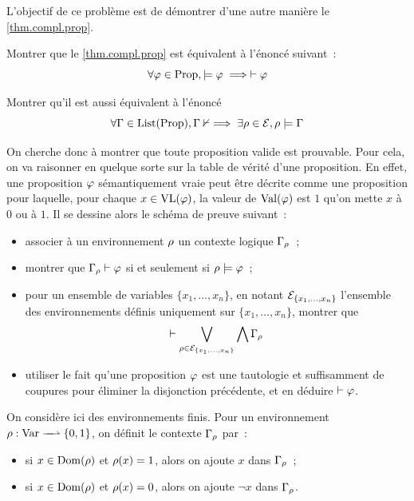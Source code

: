\begin{problem}
  L'objectif de ce problème est de démontrer d'une autre manière le
  \cref{thm.compl.prop}.


  \begin{pbQuest}
  \item Montrer que le \cref{thm.compl.prop} est équivalent à l'énoncé
    suivant~:
    \[\forall \varphi \in \operatorname{Prop}, \models \varphi \implies \vdash \varphi\]
  \item Montrer qu'il est aussi équivalent à l'énoncé
    \[\forall \Gamma \in \operatorname{List}(\operatorname{Prop}), \Gamma\nvdash \implies
    \exists \rho \in \mathcal E, \rho \models \Gamma\]
  \end{pbQuest}


  \noindent
  On cherche donc à montrer que toute proposition valide est prouvable. Pour
  cela, on va raisonner en quelque sorte sur la table de vérité d'une
  proposition. En effet, une proposition $\varphi$ sémantiquement vraie peut
  être décrite comme une proposition pour laquelle, pour chaque
  $x \in \operatorname{VL}(\varphi)$, la valeur de $\operatorname{Val}(\varphi)$ est $1$ qu'on mette $x$ à
  $0$ ou à $1$. Il se dessine alors le schéma de preuve suivant~:
  \begin{itemize}
  \item associer à un environnement $\rho$ un contexte logique $\Gamma_{\rho}$~;
  \item montrer que $\Gamma_{\rho} \vdash \varphi$ si et seulement si
    $\rho \models \varphi$~;
  \item pour un ensemble de variables $\{x_1,\ldots,x_n\}$, en notant
    $\mathcal E_{\{x_1,\ldots,x_n\}}$ l'ensemble des environnements définis uniquement
    sur $\{x_1,\ldots,x_n\}$, montrer que
    \[\vdash \bigvee_{\rho \in \mathcal E_{\{x_1,\ldots,x_n\}}} \bigwedge \Gamma_{\rho}\]
  \item utiliser le fait qu'une proposition $\varphi$ est une tautologie et
    suffisamment de coupures pour éliminer la disjonction précédente, et en
    déduire $\vdash \varphi$.
  \end{itemize}

  \noindent
  On considère ici des environnements finis. Pour un environnement
  $\makeFunNamePartial{\env}{\Var}{\intB}$, on définit le contexte
  $\Gamma_{\rho}$ par~:
  \begin{itemize}
  \item si $x \in \operatorname{Dom}(\rho)$ et $\rho(x) = 1$, alors on ajoute $x$ dans
    $\Gamma_{\rho}$~;
  \item si $x \in \operatorname{Dom}(\rho)$ et $\rho(x) = 0$, alors on ajoute $\lnot x$ dans
    $\Gamma_{\rho}$.
  \end{itemize}


\end{problem}

